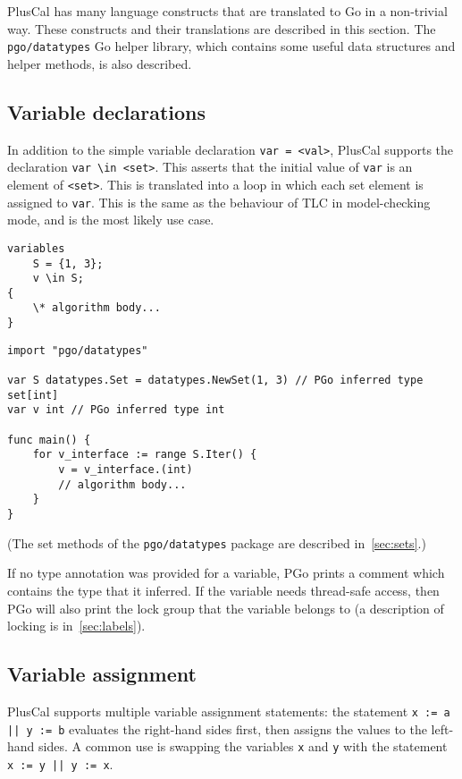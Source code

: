 PlusCal has many language constructs that are translated to Go in a non-trivial way. These constructs and their translations are described in this section. The \texttt{pgo/datatypes} Go helper library, which contains some useful data structures and helper methods, is also described.

\subsection{Variable declarations}
In addition to the simple variable declaration \verb|var = <val>|, PlusCal supports the declaration \verb|var \in <set>|. This asserts that the initial value of \texttt{var} is an element of \texttt{<set>}. This is translated into a loop in which each set element is assigned to \texttt{var}. This is the same as the behaviour of TLC in model-checking mode, and is the most likely use case.

\noindent
\begin{minipage}[t]{\textwidth}
\begin{lstlisting}[language=pcal]
variables
	S = {1, 3};
	v \in S;
{
	\* algorithm body...
}
\end{lstlisting}
\end{minipage}

\begin{minipage}[t]{\textwidth}
\begin{lstlisting}[language=golang]
import "pgo/datatypes"

var S datatypes.Set = datatypes.NewSet(1, 3) // PGo inferred type set[int]
var v int // PGo inferred type int

func main() {
	for v_interface := range S.Iter() {
		v = v_interface.(int)
		// algorithm body...
	}
}
\end{lstlisting}
\end{minipage}

(The set methods of the \texttt{pgo/datatypes} package are described in~\ref{sec:sets}.)

If no type annotation was provided for a variable, PGo prints a comment which contains the type that it inferred. If the variable needs thread-safe access, then PGo will also print the lock group that the variable belongs to (a description of locking is in~\ref{sec:labels}).

\subsection{Variable assignment}
PlusCal supports multiple variable assignment statements: the statement \texttt{x := a || y := b} evaluates the right-hand sides first, then assigns the values to the left-hand sides. A common use is swapping the variables \texttt{x} and \texttt{y} with the statement \texttt{x := y || y := x}.

